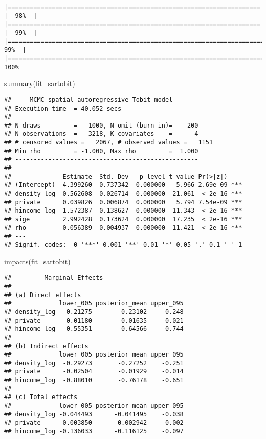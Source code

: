 \documentclass[10pt,letterpaper]{article}
\newenvironment{Shaded}{\begin{snugshade}}{\end{snugshade}}
\newcommand{\FunctionTok}[1]{\textcolor[rgb]{0.00,0.00,0.00}{#1}}
\newcommand{\NormalTok}[1]{#1}
\begin{document}
\begin{verbatim}
|===================================================================== |  98%  |                                                                              |===================================================================== |  99%  |                                                                              |======================================================================|  99%  |                                                                              |======================================================================| 100%
\end{verbatim}

\begin{Shaded}
\begin{Highlighting}[]
\FunctionTok{summary}\NormalTok{(fit\_sartobit)}
\end{Highlighting}
\end{Shaded}

\begin{verbatim}
## ----MCMC spatial autoregressive Tobit model ----
## Execution time  = 40.052 secs
## 
## N draws         =   1000, N omit (burn-in)=    200
## N observations  =   3218, K covariates    =      4
## # censored values =   2067, # observed values =   1151
## Min rho         = -1.000, Max rho         =  1.000
## --------------------------------------------------
## 
##              Estimate  Std. Dev   p-level t-value Pr(>|z|)    
## (Intercept) -4.399260  0.737342  0.000000  -5.966 2.69e-09 ***
## density_log  0.562608  0.026714  0.000000  21.061  < 2e-16 ***
## private      0.039826  0.006874  0.000000   5.794 7.54e-09 ***
## hincome_log  1.572387  0.138627  0.000000  11.343  < 2e-16 ***
## sige         2.992428  0.173624  0.000000  17.235  < 2e-16 ***
## rho          0.056389  0.004937  0.000000  11.421  < 2e-16 ***
## ---
## Signif. codes:  0 '***' 0.001 '**' 0.01 '*' 0.05 '.' 0.1 ' ' 1
\end{verbatim}

\begin{Shaded}
\begin{Highlighting}[]
\FunctionTok{impacts}\NormalTok{(fit\_sartobit)}
\end{Highlighting}
\end{Shaded}

\begin{verbatim}
## --------Marginal Effects--------
## 
## (a) Direct effects
##             lower_005 posterior_mean upper_095
## density_log   0.21275        0.23102     0.248
## private       0.01180        0.01635     0.021
## hincome_log   0.55351        0.64566     0.744
## 
## (b) Indirect effects
##             lower_005 posterior_mean upper_095
## density_log  -0.29273       -0.27252    -0.251
## private      -0.02504       -0.01929    -0.014
## hincome_log  -0.88010       -0.76178    -0.651
## 
## (c) Total effects
##             lower_005 posterior_mean upper_095
## density_log -0.044493      -0.041495    -0.038
## private     -0.003850      -0.002942    -0.002
## hincome_log -0.136033      -0.116125    -0.097
\end{verbatim}
\end{document}
